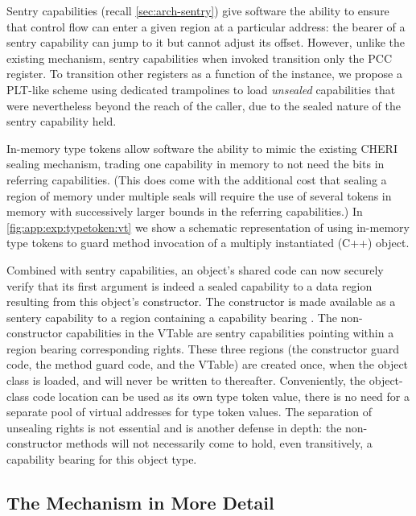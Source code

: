 Sentry capabilities (recall \cref{sec:arch-sentry}) give software the ability
to ensure that control flow can enter a given region at a particular
address: the bearer of a sentry capability can jump to it but cannot adjust
its offset.  However, unlike the existing
 mechanism, sentry capabilities when invoked transition only the PCC register.
To transition other registers as a function of the instance, we propose a
PLT-like scheme using dedicated trampolines to load \emph{unsealed}
capabilities that were nevertheless beyond the reach of the caller, due to
the sealed nature of the sentry capability held.

In-memory type tokens allow software the ability to mimic the existing
CHERI sealing mechanism, trading one capability in memory to not need the
\cotype{} bits in referring capabilities.  (This does come with the
additional cost that sealing a region of memory under multiple seals will
require the use of several tokens in memory with successively larger bounds
in the referring capabilities.) In \cref{fig:app:exp:typetoken:vt} we show a
schematic representation of using in-memory type tokens to guard method
invocation of a multiply instantiated (C++) object.

Combined with sentry capabilities, an object's shared code can now securely
verify that its first argument is indeed a sealed capability to a data
region resulting from this object's constructor.  The constructor is made
available as a sentery capability to a region containing a capability bearing
\cappermSeal.  The non-constructor capabilities in the VTable are sentry
capabilities pointing within a region bearing corresponding \cappermUnseal
rights.  These three regions (the constructor guard code, the method guard
code, and the VTable) are created once, when the object class is loaded, and
will never be written to thereafter.  Conveniently, the object-class code
location can be used as its own type token value, there is no need for a
separate pool of virtual addresses for type token values.  The separation of unsealing
rights is not essential and is another defense in depth: the non-constructor
methods will not necessarily come to hold, even transitively, a capability
bearing \cappermSeal for this object type.

\subsection{The Mechanism in More Detail} %

